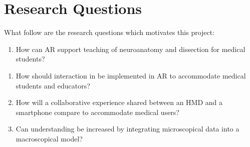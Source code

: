 
\section{Research Questions}
What follow are the research questions which motivates this project: \\

\noindent

\begin{enumerate}[label=\textbf{Main-RQ:}, left=\parindent]
    \item \label{mainrq} How can AR support teaching of neuroanatomy and dissection for medical students?
\end{enumerate}

\begin{enumerate}[label=\textbf{Sub-RQ\arabic*:}, left=\parindent, labelindent=1em]

    \item \label{subrq1} How should interaction in be implemented in AR to accommodate medical students and educators?
    \item \label{subrq2} How will a collaborative experience shared between an HMD and a smartphone compare to accommodate medical users?
    \item \label{subrq3} Can understanding be increased by integrating microscopical data into a macroscopical model?

\end{enumerate}



